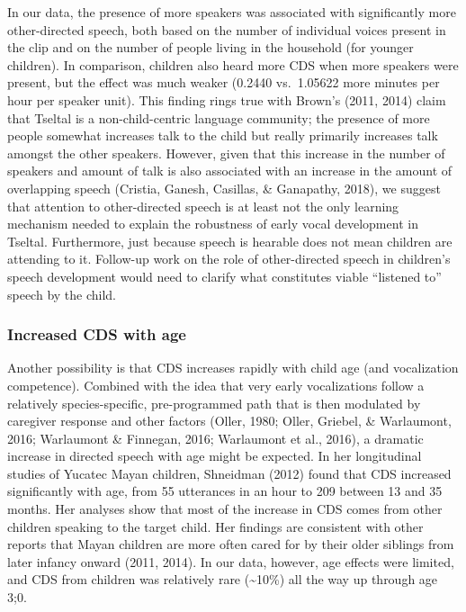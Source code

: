 \documentclass[floatsintext,man]{apa6}
\theoremstyle{definition}
\theoremstyle{definition}
\theoremstyle{definition}
\theoremstyle{remark}
\begin{document}
In our data, the presence of more speakers was associated with
significantly more other-directed speech, both based on the number of
individual voices present in the clip and on the number of people living
in the household (for younger children). In comparison, children also
heard more CDS when more speakers were present, but the effect was much
weaker (0.2440 vs.~1.05622 more minutes per hour per speaker unit). This
finding rings true with Brown's (2011, 2014) claim that Tseltal is a
non-child-centric language community; the presence of more people
somewhat increases talk to the child but really primarily increases talk
amongst the other speakers. However, given that this increase in the
number of speakers and amount of talk is also associated with an
increase in the amount of overlapping speech (Cristia, Ganesh, Casillas,
\& Ganapathy, 2018), we suggest that attention to other-directed speech
is at least not the only learning mechanism needed to explain the
robustness of early vocal development in Tseltal. Furthermore, just
because speech is hearable does not mean children are attending to it.
Follow-up work on the role of other-directed speech in children's speech
development would need to clarify what constitutes viable
\enquote{listened to} speech by the child.

\subsubsection{Increased CDS with age}\label{increased-cds-with-age}

Another possibility is that CDS increases rapidly with child age (and
vocalization competence). Combined with the idea that very early
vocalizations follow a relatively species-specific, pre-programmed path
that is then modulated by caregiver response and other factors (Oller,
1980; Oller, Griebel, \& Warlaumont, 2016; Warlaumont \& Finnegan, 2016;
Warlaumont et al., 2016), a dramatic increase in directed speech with
age might be expected. In her longitudinal studies of Yucatec Mayan
children, Shneidman (2012) found that CDS increased significantly with
age, from 55 utterances in an hour to 209 between 13 and 35 months. Her
analyses show that most of the increase in CDS comes from other children
speaking to the target child. Her findings are consistent with other
reports that Mayan children are more often cared for by their older
siblings from later infancy onward (2011, 2014). In our data, however,
age effects were limited, and CDS from children was relatively rare
(\textasciitilde{}10\%) all the way up through age 3;0.
\end{document}
